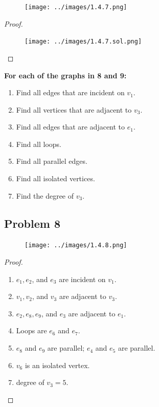 \documentclass[14pt]{extarticle}
\begin{document}
\begin{figure}[ht!]
\centering
\texttt{[image: ../images/1.4.7.png]}
\end{figure}

\begin{proof}

\begin{figure}[ht!]
\centering
\texttt{[image: ../images/1.4.7.sol.png]}
\end{figure}

\end{proof}

{\bf For each of the graphs in 8 and 9:}
\begin{enumerate}
\item Find all edges that are incident on $v_1$.
\item Find all vertices that are adjacent to $v_3$.
\item Find all edges that are adjacent to $e_1$.
\item Find all loops.
\item Find all parallel edges.
\item Find all isolated vertices.
\item Find the degree of $v_3$.
\end{enumerate}

\subsection{Problem 8}

\begin{figure}[ht!]
\centering
\texttt{[image: ../images/1.4.8.png]}
\end{figure}

\begin{proof}
\begin{enumerate}
\item $e_1, e_2$, and $e_3$ are incident on $v_1$.
\item $v_1, v_2$, and $v_3$ are adjacent to $v_3$.
\item $e_2, e_8, e_9$, and $e_3$ are adjacent to $e_1$.
\item Loops are $e_6$ and $e_7$.
\item $e_8$ and $e_9$ are parallel; $e_4$ and $e_5$ are parallel.
\item $v_6$ is an isolated vertex.
\item degree of $v_3 = 5$.
\end{enumerate}
\end{proof}
\end{document}
